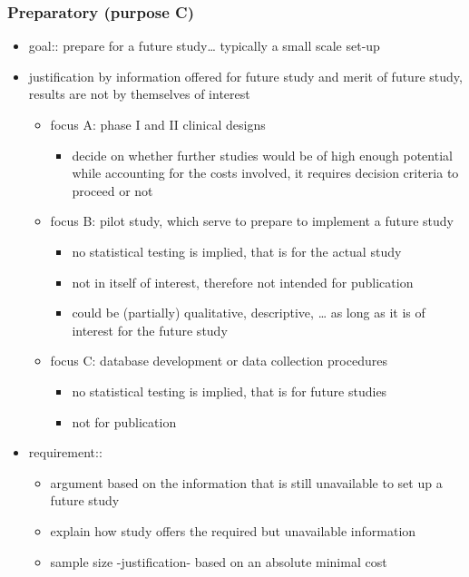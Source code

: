 \documentclass[]{article}
\providecommand{\tightlist}{%
  \setlength{\itemsep}{0pt}\setlength{\parskip}{0pt}}
\begin{document}
\subsubsection{Preparatory (purpose C)}\label{preparatory-purpose-c}

\begin{itemize}
\tightlist
\item
  goal:: prepare for a future study\ldots{} typically a small scale
  set-up
\item
  justification by information offered for future study and merit of
  future study, results are not by themselves of interest

  \begin{itemize}
  \tightlist
  \item
    focus A: phase I and II clinical designs

    \begin{itemize}
    \tightlist
    \item
      decide on whether further studies would be of high enough
      potential while accounting for the costs involved, it requires
      decision criteria to proceed or not
    \end{itemize}
  \item
    focus B: pilot study, which serve to prepare to implement a future
    study

    \begin{itemize}
    \tightlist
    \item
      no statistical testing is implied, that is for the actual study
    \item
      not in itself of interest, therefore not intended for publication
    \item
      could be (partially) qualitative, descriptive, \ldots{} as long as
      it is of interest for the future study
    \end{itemize}
  \item
    focus C: database development or data collection procedures

    \begin{itemize}
    \tightlist
    \item
      no statistical testing is implied, that is for future studies
    \item
      not for publication
    \end{itemize}
  \end{itemize}
\item
  requirement::

  \begin{itemize}
  \tightlist
  \item
    argument based on the information that is still unavailable to set
    up a future study
  \item
    explain how study offers the required but unavailable information
  \item
    sample size -justification- based on an absolute minimal cost


\end{itemize}
\end{itemize}
\end{document}
